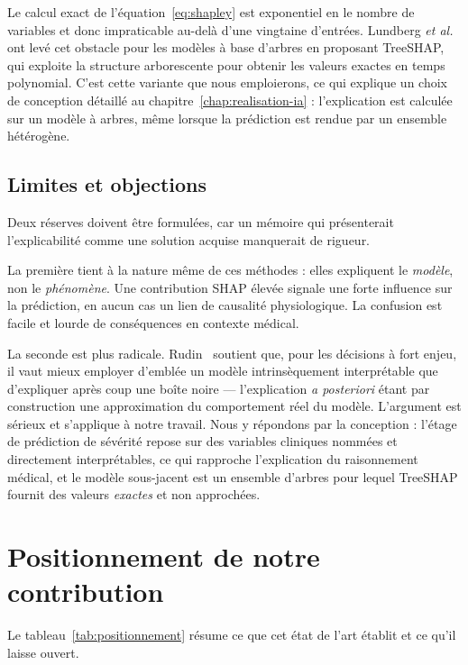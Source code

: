 Le calcul exact de l'équation~\eqref{eq:shapley} est exponentiel en le nombre de
variables et donc impraticable au-delà d'une vingtaine d'entrées. Lundberg
\emph{et al.}~\cite{lundberg2020} ont levé cet obstacle pour les modèles à base
d'arbres en proposant TreeSHAP, qui exploite la structure arborescente pour obtenir
les valeurs exactes en temps polynomial. C'est cette variante que nous emploierons,
ce qui explique un choix de conception détaillé au
chapitre~\ref{chap:realisation-ia} : l'explication est calculée sur un modèle à
arbres, même lorsque la prédiction est rendue par un ensemble hétérogène.

\subsection{Limites et objections}

Deux réserves doivent être formulées, car un mémoire qui présenterait l'explicabilité
comme une solution acquise manquerait de rigueur.

La première tient à la nature même de ces méthodes : elles expliquent le
\emph{modèle}, non le \emph{phénomène}. Une contribution SHAP élevée signale une forte
influence sur la prédiction, en aucun cas un lien de causalité physiologique. La
confusion est facile et lourde de conséquences en contexte médical.

La seconde est plus radicale. Rudin~\cite{rudin2019} soutient que, pour les décisions
à fort enjeu, il vaut mieux employer d'emblée un modèle intrinsèquement interprétable
que d'expliquer après coup une boîte noire — l'explication \emph{a posteriori} étant
par construction une approximation du comportement réel du modèle. L'argument est
sérieux et s'applique à notre travail. Nous y répondons par la conception : l'étage de
prédiction de sévérité repose sur des variables cliniques nommées et directement
interprétables, ce qui rapproche l'explication du raisonnement médical, et le modèle
sous-jacent est un ensemble d'arbres pour lequel TreeSHAP fournit des valeurs
\emph{exactes} et non approchées.

\section{Positionnement de notre contribution}

Le tableau~\ref{tab:positionnement} résume ce que cet état de l'art établit et ce
qu'il laisse ouvert.

